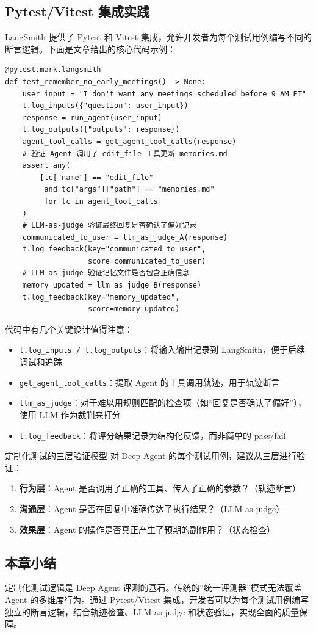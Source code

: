 \subsection{Pytest/Vitest 集成实践}

LangSmith 提供了 Pytest 和 Vitest 集成，允许开发者为每个测试用例编写不同的断言逻辑。下面是文章给出的核心代码示例：

\begin{lstlisting}[caption={LangSmith Pytest 集成 --- 定制化 Agent 测试}, label={lst:bespoke-test}]
@pytest.mark.langsmith
def test_remember_no_early_meetings() -> None:
    user_input = "I don't want any meetings scheduled before 9 AM ET"
    t.log_inputs({"question": user_input})
    response = run_agent(user_input)
    t.log_outputs({"outputs": response})
    agent_tool_calls = get_agent_tool_calls(response)
    # 验证 Agent 调用了 edit_file 工具更新 memories.md
    assert any(
        [tc["name"] == "edit_file"
         and tc["args"]["path"] == "memories.md"
         for tc in agent_tool_calls]
    )
    # LLM-as-judge 验证最终回复是否确认了偏好记录
    communicated_to_user = llm_as_judge_A(response)
    t.log_feedback(key="communicated_to_user",
                   score=communicated_to_user)
    # LLM-as-judge 验证记忆文件是否包含正确信息
    memory_updated = llm_as_judge_B(response)
    t.log_feedback(key="memory_updated",
                   score=memory_updated)
\end{lstlisting}

代码中有几个关键设计值得注意：

\begin{itemize}
  \item \texttt{t.log\_inputs / t.log\_outputs}：将输入输出记录到 LangSmith，便于后续调试和追踪
  \item \texttt{get\_agent\_tool\_calls}：提取 Agent 的工具调用轨迹，用于轨迹断言
  \item \texttt{llm\_as\_judge}：对于难以用规则匹配的检查项（如``回复是否确认了偏好''），使用 LLM 作为裁判来打分
  \item \texttt{t.log\_feedback}：将评分结果记录为结构化反馈，而非简单的 pass/fail
\end{itemize}

\begin{importantbox}{定制化测试的三层验证模型}
对 Deep Agent 的每个测试用例，建议从三层进行验证：
\begin{enumerate}
  \item \textbf{行为层}：Agent 是否调用了正确的工具、传入了正确的参数？（轨迹断言）
  \item \textbf{沟通层}：Agent 是否在回复中准确传达了执行结果？（LLM-as-judge）
  \item \textbf{效果层}：Agent 的操作是否真正产生了预期的副作用？（状态检查）
\end{enumerate}
\end{importantbox}

\subsection{本章小结}

定制化测试逻辑是 Deep Agent 评测的基石。传统的``统一评测器''模式无法覆盖 Agent 的多维度行为。通过 Pytest/Vitest 集成，开发者可以为每个测试用例编写独立的断言逻辑，结合轨迹检查、LLM-as-judge 和状态验证，实现全面的质量保障。


